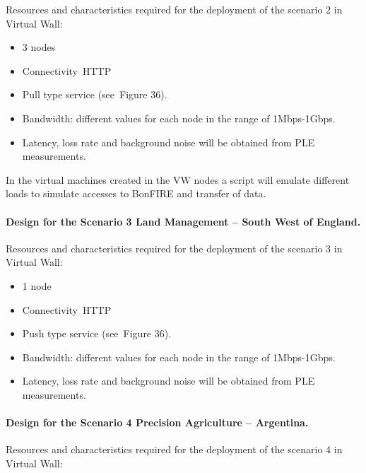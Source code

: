 \documentclass[a4paper]{article}
\newcommand\liststyleLFOxl{%
\renewcommand\labelitemi{[F0B7?]}
\renewcommand\labelitemii{o}
\renewcommand\labelitemiii{[F0A7?]}
\renewcommand\labelitemiv{[F0B7?]}
}
\begin{document}
\bigskip

Resources and characteristics required for the deployment of the
scenario 2 in Virtual Wall:\ 

\liststyleLFOxl
\begin{itemize}
\item 3 nodes
\item Connectivity\ HTTP
\item Pull type service (see\ Figure 36).
\item Bandwidth: different values for each node in the range of
1Mbps-1Gbps.
\item Latency, loss rate and background noise will be obtained from PLE
measurements.
\end{itemize}
In the virtual machines created in the VW nodes a script will emulate
different loads to simulate accesses to BonFIRE and transfer of data.


\bigskip

\paragraph[Design for the Scenario 3 Land Management {}-- South West of
England.]{Design for the Scenario 3 Land Management -- South West of
England.}

\bigskip

Resources and characteristics required for the deployment of the
scenario 3 in Virtual Wall:\ 

\liststyleLFOxl
\begin{itemize}
\item 1 node
\item Connectivity\ HTTP
\item Push type service (see\ Figure 36).
\item Bandwidth: different values for each node in the range of
1Mbps-1Gbps.
\item Latency, loss rate and background noise will be obtained from PLE
measurements.
\end{itemize}

\bigskip

\paragraph[Design for the Scenario 4 Precision Agriculture {}--
Argentina.]{Design for the Scenario 4 Precision Agriculture --
Argentina.}

\bigskip

Resources and characteristics required for the deployment of the
scenario 4 in Virtual Wall:\ 
\end{document}
